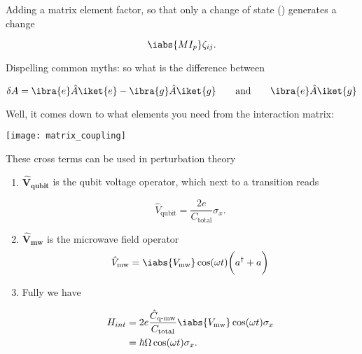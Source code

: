 \begin{minipage}{0.5\linewidth}
\begin{enumerate}
    \noindent {}

    Adding  a matrix  element factor,  so that  only a  change of  state
    (\ilra{}) generates a change

    \begin{equation}\label{eq:couple13}
      \iabs{MI_p}\zeta_{ij}.
    \end{equation}

  \end{enumerate}
\end{minipage}

\newpage

\begin{framed}
  \noindent Dispelling common myths: so what is the difference between

  \begin{equation}
    \label{eq:myth1}
    \delta A = \ibra{e}\hat{A}\iket{e} - \ibra{g}\hat{A}\iket{g} \qquad \text{and} \qquad \ibra{e}\hat{A}\iket{g}
  \end{equation}

  \noindent  Well, it  comes down  to what  elements you  need from  the
  interaction matrix:

  \begin{center}
    \texttt{[image: matrix\_coupling]}

    {\small   These   cross   terms   can  be   used   in   perturbation
      theory\label{fig:matrix_coupling}}
  \end{center}

\end{framed}
\begin{enumerate}

\item $  \mathbf{\hat{V}_\text{qubit}} $ is the  qubit voltage operator,
  which next to a transition reads

  \begin{equation}\label{eq:couple5}
    \hat{V}_\text{qubit} = \frac{2e}{C_\text{total}}\sigma_x.
  \end{equation}

\item $ \mathbf{\hat{V}_\text{mw}} $ is the microwave field operator
  \begin{equation}\label{eq:couple6}
    {\hat{V}_\text{mw} = \iabs{V_{\text{mw}}}\cos(\omega t)\bigg(a^\dagger +a\bigg)}
  \end{equation}
\item Fully we have

  \begin{equation}
    \begin{aligned}
      H_{int}&=2e\frac{\hat{C}_\text{q-mw}}{C_\text{total}}\iabs{V_{\text{mw}}}\cos(\omega t)\sigma_x\\
      &= \hbar\Omega\cos(\omega t)\sigma_x.
    \end{aligned}
  \end{equation}
\end{enumerate}


